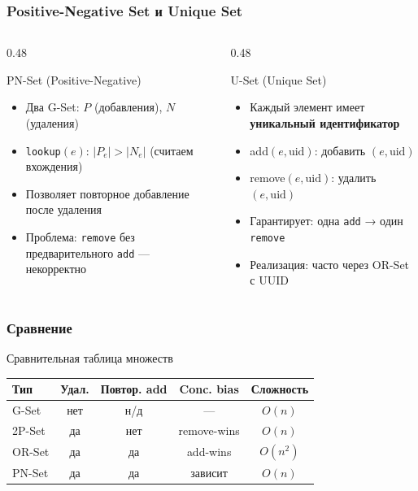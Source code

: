 \documentclass{beamer}
\begin{document}
\begin{frame}
\frametitle{Positive-Negative Set и Unique Set}

\begin{columns}
\begin{column}{0.48\textwidth}
\begin{block}{PN-Set (Positive-Negative)}
\begin{itemize}
  \item Два G-Set: $P$ (добавления), $N$ (удаления)
  \item \texttt{lookup}$(e)$: $|P_e| > |N_e|$ (считаем вхождения)
  \item Позволяет повторное добавление после удаления
  \item Проблема: \texttt{remove} без предварительного \texttt{add} — некорректно
\end{itemize}
\end{block}
\end{column}
\begin{column}{0.48\textwidth}
\begin{block}{U-Set (Unique Set)}
\begin{itemize}
  \item Каждый элемент имеет \textbf{уникальный идентификатор}
  \item add$(e,\text{uid})$: добавить $(e,\text{uid})$
  \item remove$(e,\text{uid})$: удалить $(e,\text{uid})$
  \item Гарантирует: одна \texttt{add} → один \texttt{remove}
  \item Реализация: часто через OR-Set с UUID
\end{itemize}
\end{block}
\end{column}
\end{columns}

\end{frame}

\begin{frame}
\frametitle{Сравнение}

\begin{exampleblock}{Сравнительная таблица множеств}
\small
\begin{tabular}{lcccc}
\toprule
\textbf{Тип} & \textbf{Удал.} & \textbf{Повтор. add} & \textbf{Conc. bias} & \textbf{Сложность} \\
\midrule
G-Set   & нет  & н/д    & —           & $O(n)$ \\
2P-Set  & да   & нет    & remove-wins & $O(n)$ \\
OR-Set  & да   & да     & add-wins    & $O(n^2)$ \\
PN-Set  & да   & да     & зависит     & $O(n)$ \\
\bottomrule
\end{tabular}
\end{exampleblock}

\end{frame}
\end{document}

